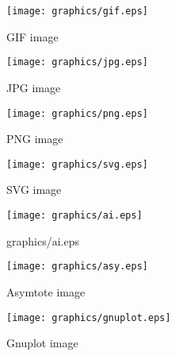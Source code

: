 \documentclass{scrartcl}
\begin{document}
\begin{figure}
\texttt{[image: graphics/gif.eps]}
\caption{GIF image}
\end{figure}
\begin{figure}
\texttt{[image: graphics/jpg.eps]}
\caption{JPG image}
\end{figure}
\begin{figure}
\texttt{[image: graphics/png.eps]}
\caption{PNG image}
\end{figure}
\begin{figure}
\texttt{[image: graphics/svg.eps]}
\caption{SVG image}
\end{figure}
\begin{figure}
\texttt{[image: graphics/ai.eps]}
\caption{graphics/ai.eps}
\end{figure}
\begin{figure}
\texttt{[image: graphics/asy.eps]}
\caption{Asymtote image}
\end{figure}
\begin{figure}
\end{figure}
\begin{figure}
\end{figure}
\begin{figure}
\texttt{[image: graphics/gnuplot.eps]}
\caption{Gnuplot image}
\end{figure}
\end{document}
